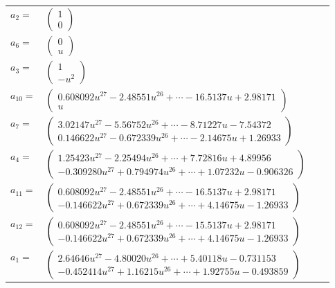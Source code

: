 \documentclass[1p]{elsarticle_modified}
\theoremstyle{definition}
\begin{document}
\begin{tabular}{m{7pt} m{180pt} m{7pt} m{180pt} }
\flushright $a_{2}=$&$\begin{pmatrix}1\\0\end{pmatrix}$ \\
\flushright $a_{6}=$&$\begin{pmatrix}0\\u\end{pmatrix}$ \\
\flushright $a_{3}=$&$\begin{pmatrix}1\\- u^2\end{pmatrix}$ \\
\flushright $a_{10}=$&$\begin{pmatrix}0.608092 u^{27}-2.48551 u^{26}+\cdots-16.5137 u+2.98171\\u\end{pmatrix}$ \\
\flushright $a_{7}=$&$\begin{pmatrix}3.02147 u^{27}-5.56752 u^{26}+\cdots-8.71227 u-7.54372\\0.146622 u^{27}-0.672339 u^{26}+\cdots-2.14675 u+1.26933\end{pmatrix}$ \\
\flushright $a_{4}=$&$\begin{pmatrix}1.25423 u^{27}-2.25494 u^{26}+\cdots+7.72816 u+4.89956\\-0.309280 u^{27}+0.794974 u^{26}+\cdots+1.07232 u-0.906326\end{pmatrix}$ \\
\flushright $a_{11}=$&$\begin{pmatrix}0.608092 u^{27}-2.48551 u^{26}+\cdots-16.5137 u+2.98171\\-0.146622 u^{27}+0.672339 u^{26}+\cdots+4.14675 u-1.26933\end{pmatrix}$ \\
\flushright $a_{12}=$&$\begin{pmatrix}0.608092 u^{27}-2.48551 u^{26}+\cdots-15.5137 u+2.98171\\-0.146622 u^{27}+0.672339 u^{26}+\cdots+4.14675 u-1.26933\end{pmatrix}$ \\
\flushright $a_{1}=$&$\begin{pmatrix}2.64646 u^{27}-4.80020 u^{26}+\cdots+5.40118 u-0.731153\\-0.452414 u^{27}+1.16215 u^{26}+\cdots+1.92755 u-0.493859\end{pmatrix}$ \\

\end{tabular}
\end{document}
